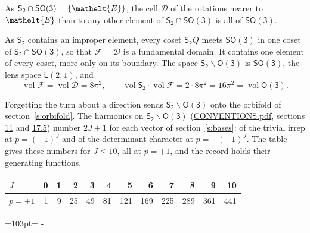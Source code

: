\documentclass[10pt,a4paper]{article}
\newcommand{\needspace}[1]{\par\penalty-100\begingroup\dimen0=#1\relax\dimen2=\pagegoal
  \advance\dimen2-\pagetotal\ifdim\dimen0>\dimen2\relax\ifdim\dimen2>0pt\vfil\break\fi\fi
  \endgroup}
\numberwithin{equation}{section}
\newcommand{\eltfont}[1]{{\let\sigma\eltsigma\mathelt{#1}}}
\newcommand{\grp}[1]{\mathsf{#1}}
\newcommand{\elt}[1]{\eltfont{#1}}
\newcommand{\vol}{\operatorname{vol}}
\newcommand{\fcell}{\mathcal{D}}
\newcommand{\fdomain}{\mathcal{F}}
\newcommand{\lensspace}[2]{\mathsf{L}(#1, #2)}
\begin{document}
\leavevmode\label{n:set.cell}As $\grp{S_{2}} \cap \grp{SO(3)} = \{\elt{E}\}$, the cell $\fcell$ of the rotations nearer to $\elt{E}$ than to any other element of $\grp{S_{2}} \cap \grp{SO(3)}$ is all of \href{SO3.pdf}{$\grp{SO(3)}$}.

\leavevmode\label{n:set.fundamental}As $\grp{S_{2}}$ contains an improper element, every coset $\grp{S_{2}}Q$ meets \href{SO3.pdf}{$\grp{SO(3)}$} in one coset of $\grp{S_{2}} \cap \grp{SO(3)}$, so that $\fdomain = \fcell$ is a fundamental domain. It contains one element of every coset, more only on its boundary.
\leavevmode\label{n:set.lens}The space $\grp{S_{2}}\backslash\grp{O(3)}$ is \href{SO3.pdf}{$\grp{SO(3)}$}, the lens space $\lensspace{2}{1}$, and
\begin{equation}\label{e:volume}\vol\fdomain = \vol\fcell = 8\pi^2,\qquad \vol\grp{S_{2}}\cdot\vol\fdomain = 2\cdot 8\pi^2 = 16\pi^2 = \vol\grp{O(3)}.\end{equation}

Forgetting the turn about a direction sends $\grp{S_{2}}\backslash\grp{O(3)}$ onto the orbifold of section~\ref{s:orbifold}.
The harmonics on $\grp{S_{2}}\backslash\grp{O(3)}$ (\href{../../CONVENTIONS.pdf}{CONVENTIONS.pdf}, sections \href{../../CONVENTIONS.pdf\#conv.11}{11} and \href{../../CONVENTIONS.pdf\#conv.17.5}{17.5}) number $2J + 1$ for each vector of section~\ref{s:bases}: of the trivial irrep at $p = (-1)^J$ and of the determinant character at $p = -(-1)^J$. The table gives these numbers for $J \le 10$, all at $p = +1$, and the record holds their generating functions.
{\small\setlength{\tabcolsep}{4pt}\begin{longtable}{@{}lrrrrrrrrrrr@{}}\toprule
$J$ & 0 & 1 & 2 & 3 & 4 & 5 & 6 & 7 & 8 & 9 & 10\\\midrule\endhead
\bottomrule\endfoot\endlastfoot
$p = +1$ & 1 & 9 & 25 & 49 & 81 & 121 & 169 & 225 & 289 & 361 & 441\\
\bottomrule\end{longtable}}
\needspace{103pt}
\end{document}
